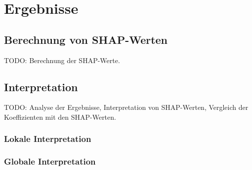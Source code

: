 \chapter{Ergebnisse}
\section{Berechnung von \acs{SHAP}-Werten}

TODO: Berechnung der \acs{SHAP}-Werte.

\section{Interpretation}

TODO: Analyse der Ergebnisse, Interpretation von \acs{SHAP}-Werten, Vergleich der Koeffizienten mit den \acs{SHAP-Werten}.

\subsection{Lokale Interpretation}
\subsection{Globale Interpretation}